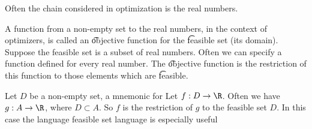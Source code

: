 

Often the chain considered in optimization is the real numbers.


A function from a non-empty set to the real numbers, in the context of optimizers, is called an \t{objective function} for the \t{feasible set} (its domain).
Suppose the feasible set is a subset of real numbers.
Often we can specify a function defined for every real number.
The \t{objective function} is the restriction of this function to those elements which are \t{feasible}.


Let $D$ be a non-empty set, a mnemonic for 
Let $f: D \to \R$.
Often we have $g: A \to \R$, where $D \subset A$.
So $f$ is the restriction of $g$ to the feasible set $D$.
In this case the language feasible set language is especially useful

\blankpage
